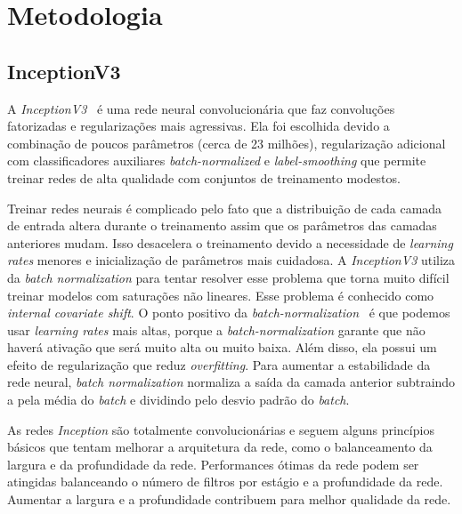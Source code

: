 \documentclass{bmvc2k}
\begin{document}
\section{Metodologia}
\label{sec:met}
\subsection{InceptionV3}
\label{met:inception}
A \textit{InceptionV3}~\cite{inception} é uma rede neural convolucionária que faz convoluções fatorizadas e regularizações mais agressivas. Ela foi escolhida devido a combinação de poucos parâmetros (cerca de 23 milhões), regularização adicional com classificadores auxiliares \textit{batch-normalized} e \textit{label-smoothing} que permite treinar redes de alta qualidade com conjuntos de treinamento modestos. 

Treinar redes neurais é complicado pelo fato que a distribuição de cada camada de entrada altera durante o treinamento assim que os parâmetros das camadas anteriores mudam. Isso desacelera o treinamento devido a necessidade de \textit{learning rates} menores e inicialização de parâmetros mais cuidadosa. A \textit{InceptionV3} utiliza da \textit{batch normalization} para tentar resolver esse problema que torna muito difícil treinar modelos com saturações não lineares. Esse problema é conhecido como \textit{internal covariate shift}.
O ponto positivo da \textit{batch-normalization}~\cite{batch} é que podemos usar \textit{learning rates} mais altas, porque a \textit{batch-normalization} garante que não haverá ativação que será muito alta ou muito baixa. Além disso, ela possui um efeito de regularização que reduz \textit{overfitting}. Para aumentar a estabilidade da rede neural, \textit{batch normalization} normaliza a saída da camada anterior subtraindo a pela média do \textit{batch} e dividindo pelo desvio padrão do \textit{batch}. 

As redes \textit{Inception} são totalmente convolucionárias e seguem alguns princípios básicos que tentam melhorar a arquitetura da rede, como o balanceamento da largura e da profundidade da rede. Performances ótimas da rede podem ser atingidas balanceando o número de filtros por estágio e a profundidade da rede. Aumentar a largura e a profundidade contribuem para melhor qualidade da rede. 
\end{document}
